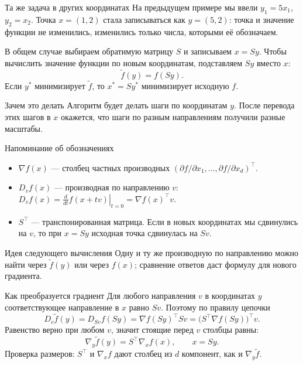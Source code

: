 \documentclass[aspectratio=169,10pt]{beamer}
\newcommand{\grad}{\nabla}
\begin{document}
\begin{frame}{Та же задача в других координатах}
\small
На предыдущем примере мы ввели $y_1=5x_1$, $y_2=x_2$.
Точка $x=(1,2)$ стала записываться как $y=(5,2)$: точка и значение функции не изменились, изменились только числа, которыми её обозначаем.
\par\vspace{.5em}
В общем случае выбираем обратимую матрицу $S$ и записываем $x=Sy$.
Чтобы вычислить значение функции по новым координатам, подставляем $Sy$ вместо $x$:
\[
\widetilde f(y)=f(Sy).
\]
Если $y^*$ минимизирует $\widetilde f$, то $x^*=Sy^*$ минимизирует исходную $f$.
\begin{block}{Зачем это делать}
Алгоритм будет делать шаги по координатам $y$. После перевода этих шагов в $x$ окажется, что шаги по разным направлениям получили разные масштабы.
\end{block}
\end{frame}

\begin{frame}{Напоминание об обозначениях}
\small
\begin{itemize}
\item $\nabla f(x)$ --- столбец частных производных
$(\partial f/\partial x_1,\ldots,\partial f/\partial x_d)^\top$.
\item $D_vf(x)$ --- производная по направлению $v$:
$D_vf(x)=\left.\frac{d}{dt}f(x+tv)\right|_{t=0}=\nabla f(x)^\top v$.
\item $S^\top$ --- транспонированная матрица. Если в новых координатах мы сдвинулись на $v$, то при $x=Sy$ исходная точка сдвинулась на $Sv$.
\end{itemize}
\begin{block}{Идея следующего вычисления}
Одну и ту же производную по направлению можно найти через $\widetilde f(y)$ или через $f(x)$; сравнение ответов даст формулу для нового градиента.
\end{block}
\end{frame}

\begin{frame}{Как преобразуется градиент}
\small
Для любого направления $v$ в координатах $y$ соответствующее направление в $x$ равно $Sv$. Поэтому по правилу цепочки
\[
D_v\widetilde f(y)=D_{Sv}f(Sy)
=\grad f(Sy)^\top Sv
=\bigl(S^\top\grad f(Sy)\bigr)^\top v.
\]
Равенство верно при любом $v$, значит стоящие перед $v$ столбцы равны:
\[
\boxed{\grad_y\widetilde f(y)=S^\top\grad_x f(x),\qquad x=Sy.}
\]
Проверка размеров: $S^\top$ и $\nabla_x f$ дают столбец из $d$ компонент, как и $\nabla_y\widetilde f$.
\end{frame}
\end{document}
